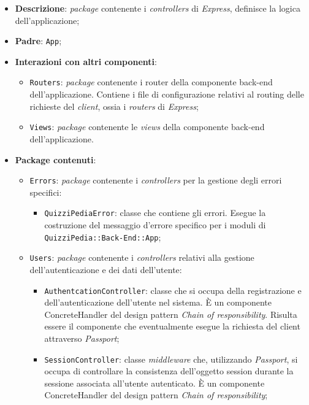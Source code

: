 	\begin{itemize}
		\item \textbf{Descrizione}:
		\textit{package} contenente i \textit{controllers} di \textit{Express}, definisce la logica dell'applicazione;
		\item \textbf{Padre}: \texttt{App};
		\item \textbf{Interazioni con altri componenti}:
			\begin{itemize}
				\item \texttt{Routers}:
				\textit{package} contenente i router della componente back-end dell'applicazione. Contiene i file di configurazione relativi al routing delle richieste del \textit{client}, ossia i \textit{routers} di \textit{Express};
				\item \texttt{Views}:
				\textit{package} contenente le \textit{\textit{views}} della componente back-end dell'applicazione.
			\end{itemize}
		\item \textbf{Package contenuti}:
			\begin{itemize}
				\item \texttt{Errors}:
				\textit{package} contenente i \textit{controllers} per la gestione degli errori specifici:
					\begin{itemize}
						\item \texttt{QuizziPediaError}: classe che contiene gli errori. Esegue la costruzione del messaggio d'errore specifico per i moduli di \texttt{QuizziPedia::Back-End::App};
					\end{itemize}
				\item \texttt{Users}:
				\textit{package} contenente i \textit{controllers} relativi alla gestione dell'autenticazione e dei dati dell'utente:
				\begin{itemize}
					\item \texttt{AuthentcationController}: classe che si occupa della registrazione e dell'autenticazione dell'utente nel sistema. È un componente ConcreteHandler del design pattern \textit{Chain of responsibility}. Risulta essere il componente che eventualmente esegue la richiesta del client attraverso \textit{Passport};
					\item \texttt{SessionController}: classe \textit{middleware} che, utilizzando \textit{Passport}, si occupa di controllare la consistenza dell'oggetto session durante la sessione associata all'utente autenticato. È un componente ConcreteHandler del design pattern \textit{Chain of responsibility};

\end{itemize}
\end{itemize}
\end{itemize}
